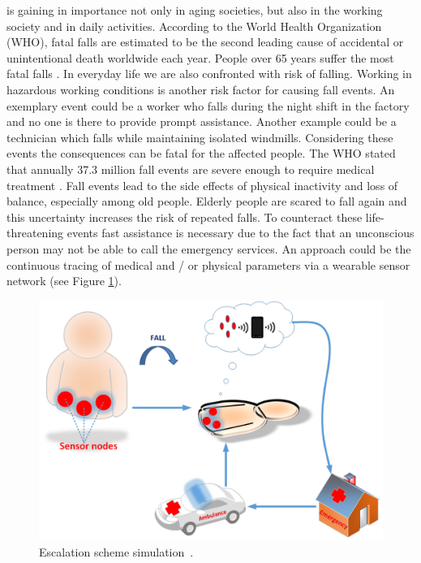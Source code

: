 \documentclass[10pt,journal,compsoc]{IEEEtran}
\begin{document}
% 
% 
% 
% 
 is gaining in importance not only in aging societies, but also in the working society and in daily activities. According to the World Health Organization (WHO), fatal falls are estimated to be the second leading cause of accidental or unintentional death worldwide each year. People over 65 years suffer the most fatal falls \cite{WHO2018}.
In everyday life we are also confronted with risk of falling. Working in hazardous working conditions is another risk factor for causing fall events. An exemplary event could be a worker who falls during the night shift in the factory and no one is there to provide prompt assistance. Another example could be a technician which falls while maintaining isolated windmills. Considering these events the consequences can be fatal for the affected people. 
The WHO stated that annually 37.3 million fall events are severe enough to require medical treatment \cite{WHO2018}. Fall events lead to the side effects of physical inactivity and loss of balance, especially among old people. Elderly people are scared to fall again and this uncertainty increases the risk of repeated falls. 
To counteract these life-threatening events fast assistance is necessary due to the fact that an unconscious person may not be able to call the emergency services. An approach could be the continuous tracing of medical and / or physical parameters via a wearable sensor network (see Figure \ref{fig:escalationscheme}).
\begin{figure}[!ht]
	\centering
	\includegraphics[scale=0.235]{Images/EscalationScheme.png}
	\caption[Escalation scheme]{Escalation scheme simulation~\cite{LaBlunda.2016,LaBlunda.2016b}.}
	\label{fig:escalationscheme}
\end{figure}
\end{document}
